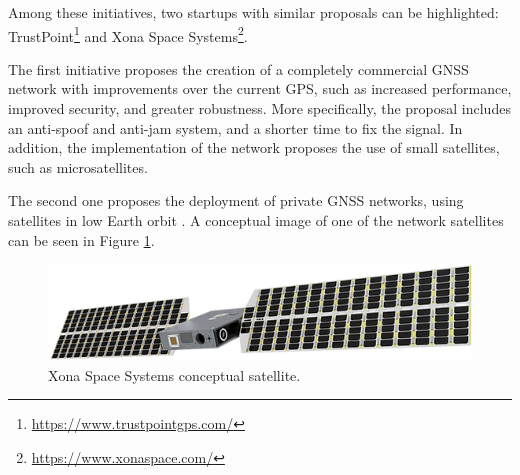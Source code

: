Among these initiatives, two startups with similar proposals can be highlighted: TrustPoint\footnote{\href{https://www.trustpointgps.com/}{https://www.trustpointgps.com/}} and Xona Space Systems\footnote{\href{https://www.xonaspace.com/}{https://www.xonaspace.com/}}.


The first initiative proposes the creation of a completely commercial GNSS network with improvements over the current GPS, such as increased performance, improved security, and greater robustness. More specifically, the proposal includes an anti-spoof and anti-jam system, and a shorter time to fix the signal. In addition, the implementation of the network proposes the use of small satellites, such as microsatellites.


The second one proposes the deployment of private GNSS networks, using satellites in low Earth orbit \cite{reid2023}. A conceptual image of one of the network satellites can be seen in Figure \ref{fig:xona-satellite}.

\begin{figure}[!ht]
    \begin{center}
        \includegraphics[width=0.8\columnwidth]{figures/xona-satellite}
        \caption{Xona Space Systems conceptual satellite.}
        \label{fig:xona-satellite}
    \end{center}
\end{figure}


